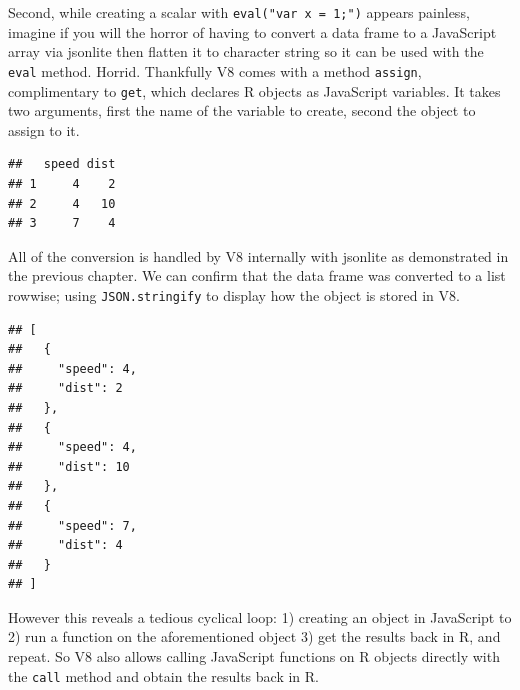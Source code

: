 \documentclass[
]{krantz}
\makeatletter
\newenvironment{Shaded}{\begin{snugshade}}{\end{snugshade}}
\newcommand{\CommentTok}[1]{\textcolor[rgb]{0.37,0.37,0.37}{\textit{#1}}}
\newcommand{\DecValTok}[1]{\textcolor[rgb]{0.06,0.06,0.06}{#1}}
\newcommand{\KeywordTok}[1]{\textcolor[rgb]{0.27,0.27,0.27}{\textbf{#1}}}
\newcommand{\NormalTok}[1]{#1}
\newcommand{\OperatorTok}[1]{\textcolor[rgb]{0.43,0.43,0.43}{\textbf{#1}}}
\newcommand{\StringTok}[1]{\textcolor[rgb]{0.5,0.5,0.5}{#1}}
\newenvironment{kframe}{%
\medskip{}
\setlength{\fboxsep}{.8em}
 \def\at@end@of@kframe{}%
 \ifinner\ifhmode%
  \def\at@end@of@kframe{\end{minipage}}%
  \begin{minipage}{\columnwidth}%
 \fi\fi%
 \def\FrameCommand##1{\hskip\@totalleftmargin \hskip-\fboxsep
 \colorbox{shadecolor}{##1}\hskip-\fboxsep
     \hskip-\linewidth \hskip-\@totalleftmargin \hskip\columnwidth}%
 \MakeFramed {\advance\hsize-\width
   \@totalleftmargin\z@ \linewidth\hsize
   \@setminipage}}%
 {\par\unskip\endMakeFramed%
 \at@end@of@kframe}
\renewenvironment{Shaded}{\begin{kframe}}{\end{kframe}}
\makeatother
\begin{document}
Second, while creating a scalar with \texttt{eval("var\ x\ =\ 1;")} appears painless, imagine if you will the horror of having to convert a data frame to a JavaScript array via jsonlite then flatten it to character string so it can be used with the \texttt{eval} method. Horrid. Thankfully V8 comes with a method \texttt{assign}, complimentary to \texttt{get}, which declares R objects as JavaScript variables. It takes two arguments, first the name of the variable to create, second the object to assign to it.

\begin{Shaded}
\end{Shaded}

\begin{verbatim}
##   speed dist
## 1     4    2
## 2     4   10
## 3     7    4
\end{verbatim}

All of the conversion is handled by V8 internally with jsonlite as demonstrated in the previous chapter. We can confirm that the data frame was converted to a list rowwise; using \texttt{JSON.stringify} to display how the object is stored in V8.

\begin{Shaded}
\end{Shaded}

\begin{verbatim}
## [
##   {
##     "speed": 4,
##     "dist": 2
##   },
##   {
##     "speed": 4,
##     "dist": 10
##   },
##   {
##     "speed": 7,
##     "dist": 4
##   }
## ]
\end{verbatim}

However this reveals a tedious cyclical loop: 1) creating an object in JavaScript to 2) run a function on the aforementioned object 3) get the results back in R, and repeat. So V8 also allows calling JavaScript functions on R objects directly with the \texttt{call} method and obtain the results back in R.
\end{document}
